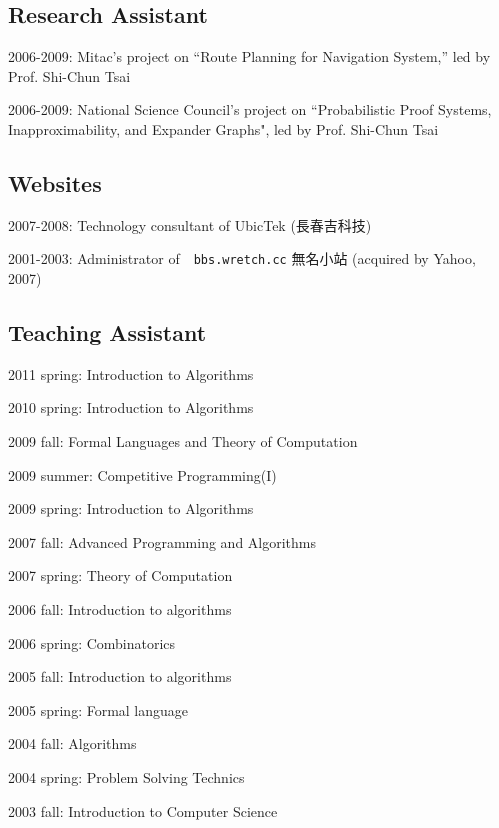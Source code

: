 \documentclass[A4]{article}
\renewenvironment{itemize}{
  \begin{list}{}{
    \setlength{\leftmargin}{1.5em}
  }
}{
  \end{list}
}
\begin{document}
\subsection*{Research Assistant}
\begin{itemize}
\item 2006-2009: Mitac's project on ``Route Planning for Navigation System,'' led by Prof. Shi-Chun Tsai
\item 2006-2009: National Science Council's project on ``Probabilistic Proof Systems, Inapproximability, and Expander Graphs", led by Prof. Shi-Chun Tsai
\end{itemize}
\subsection*{Websites}
\begin{itemize}
\item 2007-2008: Technology consultant of UbicTek ({\Sung 長春吉科技})
\item 2001-2003: Administrator of~~{\tt bbs.wretch.cc} {\Sung 無名小站} (acquired by Yahoo, 2007)
\end{itemize}
\subsection*{Teaching Assistant}
\begin{itemize}
\item 2011 spring: Introduction to Algorithms
\item 2010 spring: Introduction to Algorithms
\item 2009 fall: Formal Languages and Theory of Computation
\item 2009 summer: Competitive Programming(I)
\item 2009 spring: Introduction to Algorithms
\item 2007 fall: Advanced Programming and Algorithms
\item 2007 spring: Theory of Computation
\item 2006 fall: Introduction to algorithms
\item 2006 spring: Combinatorics
\item 2005 fall: Introduction to algorithms
\item 2005 spring: Formal language
\item 2004 fall: Algorithms
\item 2004 spring: Problem Solving Technics
\item 2003 fall: Introduction to Computer Science
\end{itemize}
\end{document}
